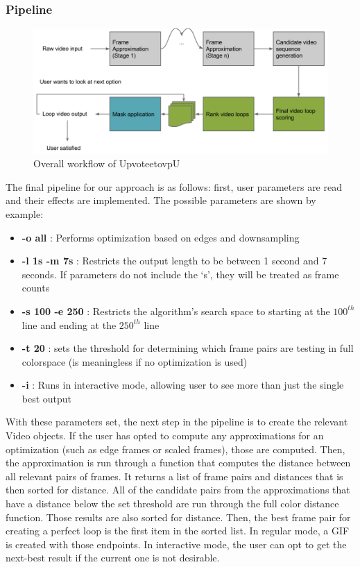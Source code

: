 \subsubsection{Pipeline}
\label{sec:Pipeline}
\begin{figure}
\centering
\includegraphics[width=1.0\textwidth]{loop-pipeline.png}
\caption{Overall workflow of UpvoteetovpU}
\label{fig:Pipeline}
\end{figure}
The final pipeline for our approach is as follows: first, user parameters are read and their effects are implemented. The possible parameters are shown by example:
\begin{itemize}
\item \textbf{-o all} : Performs optimization based on edges and downsampling
\item \textbf{-l 1s -m 7s} : Restricts the output length to be between 1 second and 7 seconds. If parameters do not include the `s', they will be treated as frame counts
\item \textbf{-s 100 -e 250} : Restricts the algorithm's search space to starting at the $100^{th}$ line and ending at the $250^{th}$ line
\item \textbf{-t 20} : sets the threshold for determining which frame pairs are testing in full colorspace (is meaningless if no optimization is used)
\item \textbf{-i} : Runs in interactive mode, allowing user to see more than just the single best output
\end{itemize}

With these parameters set, the next step in the pipeline is to create the relevant Video objects. If the user has opted to compute any approximations for an optimization (such as edge frames or scaled frames), those are computed. Then, the approximation is run through a function that computes the distance between all relevant pairs of frames. It returns a list of frame pairs and distances that is then sorted for distance. All of the candidate pairs from the approximations that have a distance below the set threshold are run through the full color distance function. Those results are also sorted for distance. Then, the best frame pair for creating a perfect loop is the first item in the sorted list. In regular mode, a GIF is created with those endpoints. In interactive mode, the user can opt to get the next-best result if the current one is not desirable.

